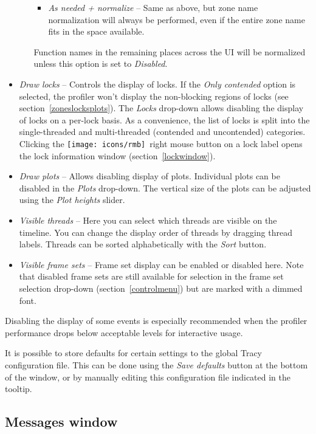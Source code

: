 \documentclass[hidelinks,titlepage,a4paper,twoside]{article}
\newcommand{\RMB}{\texttt{[image: icons/rmb]}}
\begin{document}
\begin{itemize}
\begin{itemize}
\begin{itemize}
\item \emph{As needed + normalize} -- Same as above, but zone name normalization will always be performed, even if the entire zone name fits in the space available.
\end{itemize}
Function names in the remaining places across the UI will be normalized unless this option is set to \emph{Disabled}.
\end{itemize}
\item \emph{\faLock{} Draw locks} -- Controls the display of locks. If the \emph{Only contended} option is selected, the profiler won't display the non-blocking regions of locks (see section~\ref{zoneslocksplots}). The \emph{Locks} drop-down allows disabling the display of locks on a per-lock basis. As a convenience, the list of locks is split into the single-threaded and multi-threaded (contended and uncontended) categories. Clicking the \RMB{}~right mouse button on a lock label opens the lock information window (section~\ref{lockwindow}).
\item \emph{\faSignature{} Draw plots} -- Allows disabling display of plots. Individual plots can be disabled in the \emph{Plots} drop-down. The vertical size of the plots can be adjusted using the \emph{Plot heights} slider.
\item \emph{\faRandom{} Visible threads} -- Here you can select which threads are visible on the timeline. You can change the display order of threads by dragging thread labels. Threads can be sorted alphabetically with the \emph{Sort} button.
\item \emph{\faImages{} Visible frame sets} -- Frame set display can be enabled or disabled here. Note that disabled frame sets are still available for selection in the frame set selection drop-down (section~\ref{controlmenu}) but are marked with a dimmed font.
\end{itemize}

Disabling the display of some events is especially recommended when the profiler performance drops below acceptable levels for interactive usage.

It is possible to store defaults for certain settings to the global Tracy configuration file.
This can be done using the \emph{Save defaults} button at the bottom of the window, or by manually editing this configuration file indicated in the tooltip.

\subsection{Messages window}
\label{messages}
\end{document}
